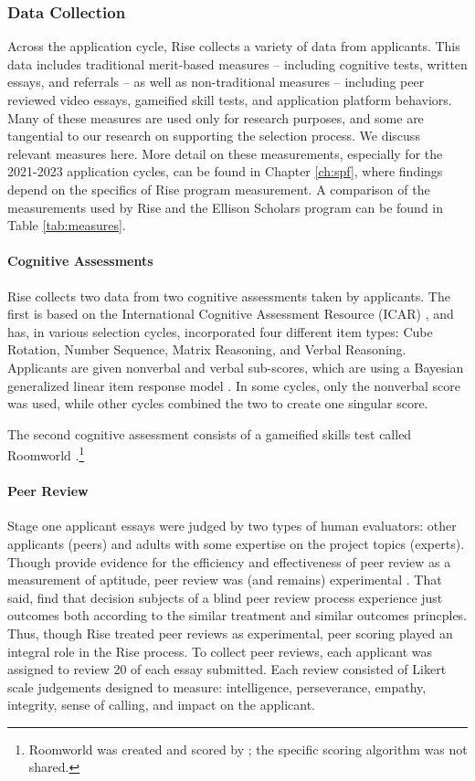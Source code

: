 \subsubsection{Data Collection}
Across the application cycle, Rise collects a variety of data from applicants. This data includes traditional merit-based measures – including cognitive tests, written essays, and referrals – as well as non-traditional measures – including peer reviewed video essays, gameified skill tests, and application platform behaviors. Many of these measures are used only for research purposes, and some are tangential to our research on supporting the selection process. We discuss relevant measures here. More detail on these measurements, especially for the 2021-2023 application cycles, can be found in Chapter \ref{ch:spf}, where findings depend on the specifics of Rise program measurement. A comparison of the measurements used by Rise and the Ellison Scholars program can be found in Table \ref{tab:measures}.

\paragraph{Cognitive Assessments}
Rise collects two data from two cognitive assessments taken by applicants. The first is based on the International Cognitive Assessment Resource (ICAR) \cite{condon2014international, subotic2020psychometric}, and has, in various selection cycles, incorporated four different item types: Cube Rotation, Number Sequence, Matrix Reasoning, and Verbal Reasoning. Applicants are given nonverbal and verbal sub-scores, which are using a Bayesian generalized linear item response model \cite{burkner2021bayesian}. In some cycles, only the nonverbal score was used, while other cycles combined the two to create one singular score.

The second cognitive assessment consists of a gameified skills test called Roomworld \cite{Dumbalska_Bhatti_Ali_Summerfield_2023}.\footnote{Roomworld was created and scored by \textcite{Dumbalska_Bhatti_Ali_Summerfield_2023}; the specific scoring algorithm was not shared.}

\paragraph{Peer Review}
Stage one applicant essays were judged by two types of human evaluators: other applicants (peers) and adults with some expertise on the project topics (experts). Though \textcite{Anvari2021EffectivenessOP} provide evidence for the efficiency and effectiveness of peer review as a measurement of aptitude, peer review was (and remains) experimental \cite{Rahmatillah2022AnalyzingFA}. That said, \textcite{VanderSchee2022UsingCP} find that decision subjects of a blind peer review process experience just outcomes both according to the similar treatment and similar outcomes princples. Thus, though Rise treated peer reviews as experimental, peer scoring played an integral role in the Rise process. To collect peer reviews, each applicant was assigned to review 20 of each essay submitted. Each review consisted of Likert scale judgements designed to measure: intelligence, perseverance, empathy, integrity, sense of calling, and impact on the applicant.

